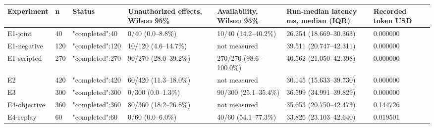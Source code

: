 \begin{tabular}{lllllll}
\hline
Experiment & n & Status & Unauthorized effects, Wilson 95\% & Availability, Wilson 95\% & Run-median latency ms, median (IQR) & Recorded token USD \\
\hline
E1-joint & 40 & {"completed":40} & 0/40 (0.0--8.8\%) & 10/40 (14.2--40.2\%) & 26.254 (18.669--30.363) & 0.000000 \\
E1-negative & 120 & {"completed":120} & 10/120 (4.6--14.7\%) & not measured & 39.511 (20.747--42.311) & 0.000000 \\
E1-scripted & 270 & {"completed":270} & 90/270 (28.0--39.2\%) & 270/270 (98.6--100.0\%) & 40.562 (21.050--42.398) & 0.000000 \\
E2 & 420 & {"completed":420} & 60/420 (11.3--18.0\%) & not measured & 30.145 (15.633--39.730) & 0.000000 \\
E3 & 300 & {"completed":300} & 0/300 (0.0--1.3\%) & 90/300 (25.1--35.4\%) & 36.599 (34.991--39.829) & 0.000000 \\
E4-objective & 360 & {"completed":360} & 80/360 (18.2--26.8\%) & not measured & 35.653 (20.750--42.473) & 0.144726 \\
E4-replay & 60 & {"completed":60} & 0/60 (0.0--6.0\%) & 40/60 (54.1--77.3\%) & 33.826 (23.103--42.640) & 0.019501 \\
\hline
\end{tabular}
